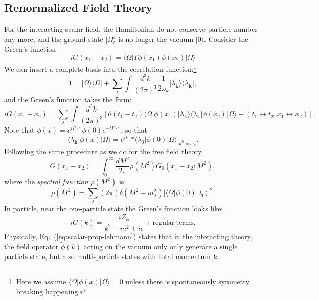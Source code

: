 \documentclass[aps,prb,superscriptaddress,nofootinbib]{revtex4}
\begin{document}
\subsection{Renormalized Field Theory}

For the interacting scalar field, the Hamiltonian do not conserve particle number any more, and the ground state $|\Omega\rangle$ is no longer the vacuum $|0\rangle$.
Consider the Green's function
\begin{equation}
	iG(x_1-x_2) = \langle\Omega|T\phi(x_1)\phi(x_2)|\Omega\rangle 
\end{equation}
We can insert a complete basis into the correlation function:\footnote{Here we assume $\langle\Omega|\phi(x)|\Omega\rangle=0$ unless there is spontaneously symmetry breaking happening.}
\begin{equation}
	1 = |\Omega\rangle\langle\Omega| + \sum_\lambda\int\frac{d^3 k}{(2\pi)^3}\frac{1}{2\omega_k}|\lambda_{\bm k}\rangle \langle\lambda_{\bm k}|,
\end{equation}
and the Green's function takes the form:
\begin{equation*}
	iG(x_1-x_2) = \sum_\lambda \int\frac{d^3 k}{(2\pi)^3}
	\left[\theta(t_1-t_2)\langle\Omega|\phi(x_1)|\lambda_{\bm k}\rangle\langle\lambda_{\bm k}|\phi(x_2)|\Omega\rangle + (t_1\leftrightarrow t_2, x_1 \leftrightarrow x_2)\right].
\end{equation*}
Note that $\phi(x)=e^{iP\cdot x}\phi(0) e^{-iP\cdot x}$, so that
\begin{equation}
	\langle\lambda_{\bm k}|\phi(x)|\Omega\rangle 
	= e^{ik\cdot x} \left.\langle\lambda_{0}|\phi(0)|\Omega\rangle\right|_{k^0=\omega_{\bm k}}.
\end{equation}
Following the same procedure as we do for the free field theory, 
\begin{equation}
	G(x_1-x_2) = \int_0^\infty \frac{dM^2}{2\pi} \rho(M^2) G_0(x_1-x_2;M^2),
\end{equation}
where the \textit{spectral function} $\rho(M^2)$ is
\begin{equation}
	\rho(M^2) = \sum_\lambda(2\pi)\delta(M^2-m_\lambda^2)|\langle\Omega|\phi(0)|\lambda_0\rangle|^2.
\end{equation}
In particle, near the one-particle state the Green's function looks like:
\begin{equation}\label{eq:scalar-prop-lehmann}
	i\tilde G(k) = \frac{iZ_{\phi}}{k^2-m^2+i\epsilon} + \mathrm{regular\ terms}.
\end{equation}
Physically, Eq.~(\ref{eq:scalar-prop-lehmann}) states that in the interacting theory, the field operator $\tilde\phi(k)$ acting on the vacuum only only generate a single particle state, but also multi-particle states with total momentum $k$.
\end{document}
